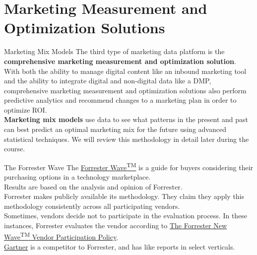 \documentclass[pdf]{beamer}
\newcommand{\empr}[1]{{\color{franklinblue}\textbf{#1}}}
\theoremstyle{remark}
\theoremstyle{definition}
\begin{document}
\section{Marketing Measurement and Optimization Solutions}

\begin{frame}[t]{Marketing Mix Models}
The third type of marketing data platform is the \empr{comprehensive marketing measurement and optimization solution}. \\
\vspace{1.5ex}
With both the ability to manage digital content like an inbound marketing tool and the ability to integrate digital and non-digital data like a DMP, comprehensive marketing measurement and optimization solutions also perform predictive analytics and recommend changes to a marketing plan in order to optimize ROI. \\
\vspace{1.5ex}
\empr{Marketing mix models} use data to see what patterns in the present and past can best predict an optimal marketing mix for the future using advanced statistical techniques.  We will review this methodology in detail later during the course.
\end{frame}

\begin{frame}[t]{The Forrester Wave}
The \href{https://www.forrester.com/policies/forrester-wave-methodology/}{Forrester Wave\textsuperscript{TM}} is a guide for buyers considering their purchasing options in a technology marketplace. \\
\vspace{1.5ex}
Results are based on the analysis and opinion of Forrester. \\
\vspace{1.5ex}
Forrester makes publicly available its methodology.  They claim  they apply this methodology consistently across all participating vendors. \\
\vspace{1.5ex}
Sometimes, vendors decide not to participate in the evaluation process. In these instances, Forrester evaluates the vendor according to \href{https://www.forrester.com/policies/wave-vendor-nonparticipation-policy/}{The Forrester New Wave\textsuperscript{TM} Vendor Participation Policy}.\\
\vspace{1.5ex}
\href{https://www.gartner.com/en}{Gartner} is a competitor to Forrester, and has like reports in select verticals. \\
\end{frame}
\end{document}
